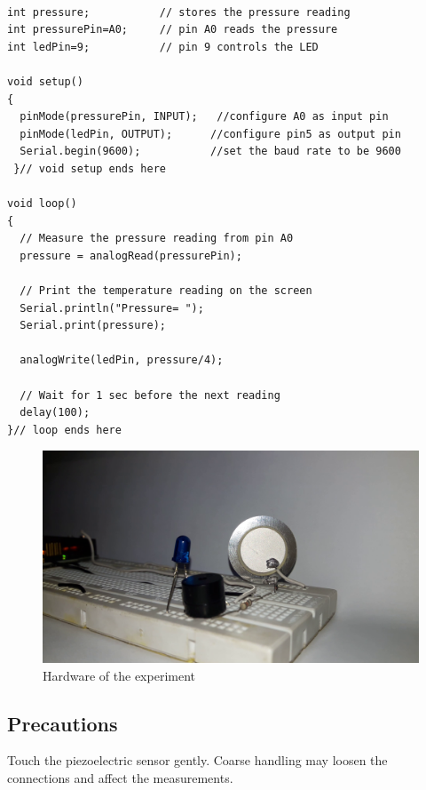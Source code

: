 \begin{lstlisting}[language=Arduino, numbers=none, caption={Arduino code for measuring the pressure},captionpos=b, label={lst:force}]

int pressure;           // stores the pressure reading 
int pressurePin=A0;     // pin A0 reads the pressure
int ledPin=9;           // pin 9 controls the LED

void setup() 
{
  pinMode(pressurePin, INPUT);   //configure A0 as input pin
  pinMode(ledPin, OUTPUT);      //configure pin5 as output pin
  Serial.begin(9600);           //set the baud rate to be 9600
 }// void setup ends here

void loop() 
{
  // Measure the pressure reading from pin A0
  pressure = analogRead(pressurePin);
  
  // Print the temperature reading on the screen
  Serial.println("Pressure= ");
  Serial.print(pressure);

  analogWrite(ledPin, pressure/4);
  
  // Wait for 1 sec before the next reading
  delay(100);
}// loop ends here

\end{lstlisting}

\begin{figure}[H]
    \centering
    \includegraphics[width=0.75\linewidth]{Figures/force-hardware.png}
    \caption{Hardware of the experiment}
\end{figure}

\subsection*{Precautions}
Touch the piezoelectric sensor gently. Coarse handling may loosen the connections and affect the measurements.